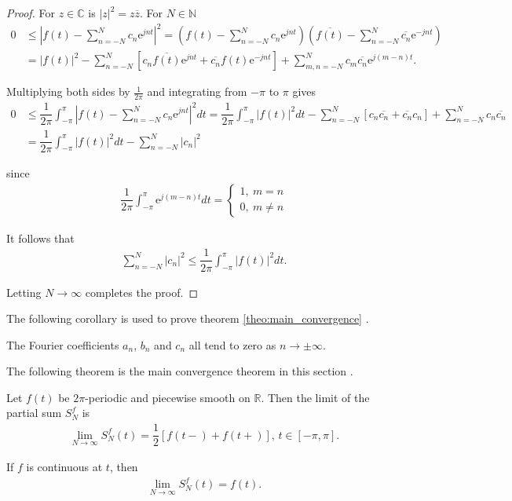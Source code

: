 \begin{proof}
For $z \in \mathbb{C}$ is $|z|^2 = z \overline{z}$. For $N \in \mathbb{N}$
\begin{align*}
0 &\leq \left| f(t) - \sum_{n=-N}^N c_n \text{e}^{jnt} \right|^2 = \left( f(t) - \sum_{n=-N}^N c_n \text{e}^{jnt} \right) \left( \overline{f(t)} - \sum_{n=-N}^N \overline{c_n} \text{e}^{-jnt} \right) \\
&= |f(t)|^2 - \sum_{n=-N}^N \left[ c_n \overline{f(t)} \text{e}^{jnt} + \overline{c_n} f(t) \text{e}^{-jnt} \right] + \sum_{m,n=-N}^N c_m\overline{c_n} \text{e}^{j(m-n)t}.
\end{align*}

Multiplying both sides by $\frac{1}{2\pi}$ and integrating from $-\pi$ to $\pi$ gives
\begin{align*}
0 &\leq \dfrac{1}{2\pi} \int_{-\pi}^\pi \left| f(t) - \sum_{n=-N}^N c_n \text{e}^{jnt} \right|^2 dt = \dfrac{1}{2\pi} \int_{-\pi}^\pi |f(t)|^2 dt - \sum_{n=-N}^N \left[ c_n \overline{c_n} + \overline{c_n} c_n \right] + \sum_{n=-N}^N c_n \overline{c_n} \\
&= \dfrac{1}{2\pi} \int_{-\pi}^\pi |f(t)|^2 dt - \sum_{n=-N}^N |c_n|^2
\end{align*}

since
\begin{align*}
\dfrac{1}{2\pi} \int_{-\pi}^\pi \text{e}^{j(m-n)t} dt =
\begin{cases}
1, \ m = n \\
0, \ m \neq n
\end{cases}
\end{align*}

It follows that
\begin{align*}
\sum_{n=-N}^N |c_n|^2 \leq \dfrac{1}{2\pi} \int_{-\pi}^\pi |f(t)|^2 dt.
\end{align*}

Letting $N\to\infty$ completes the proof.
\end{proof}

The following corollary is used to prove theorem \ref{theo:main_convergence} \cite{page 31, FAA}.

\begin{corollary} \label{coro:conv_Fourier_coeff}
The Fourier coefficients $a_n$, $b_n$ and $c_n$ all tend to zero as $n \to \pm \infty$.
\end{corollary}

The following theorem is the main convergence theorem in this section \cite{page 35, FAA}.

\begin{theorem} \label{theo:main_convergence}
Let $f(t)$ be $2\pi$-periodic and piecewise smooth on $\mathbb{R}$. Then the limit of the partial sum $S_N^f$ is
	\begin{align*}
		\lim_{N\to\infty} S_N^f (t) = \dfrac{1}{2}\left[f(t-) + 		f(t+)\right], \, t \in [-\pi, \pi].
	\end{align*}

If $f$ is continuous at $t$, then
	\begin{align*}
		\lim_{N\to \infty} S_N^f(t) = f(t).
	\end{align*}
\end{theorem}

